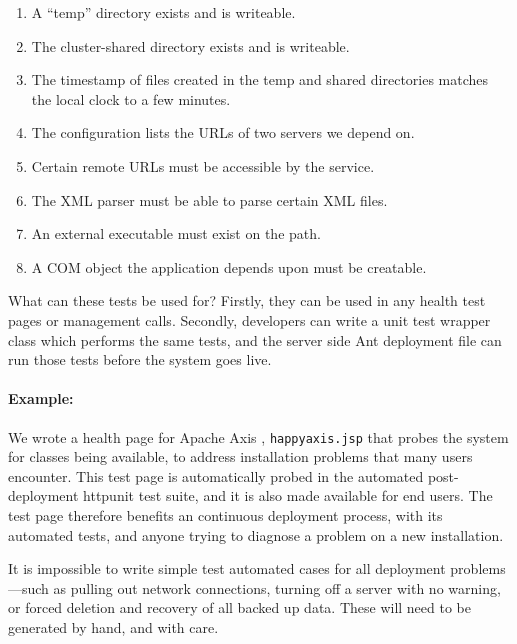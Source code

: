 \documentclass[draft]{report}
\begin{document}
\begin{enumerate}

\item A ``temp'' directory exists and is writeable.

\item The cluster-shared directory exists and is writeable.

\item The timestamp of files created in the temp and shared directories
matches the local clock to a few minutes.

\item The configuration lists the URLs of two servers we depend on.

\item Certain remote URLs must be accessible by the service.

\item The XML parser must be able to parse certain XML files.

\item An external executable must exist on the path.

\item A COM object the application depends upon must be creatable.

\end{enumerate}

What can these tests be used for? Firstly, they can be used in any
health test pages or management calls. Secondly, developers can write a
unit test wrapper class which performs the same tests, and the server
side Ant deployment file can run those tests before the system goes
live.

\paragraph{Example:} We wrote a health page for Apache Axis
\cite{apache:axis}, \verb$happyaxis.jsp$ that probes the system for
classes being available, to address installation problems that many
users encounter. This test page is automatically probed in the automated
post-deployment httpunit test suite, and it is also made available for
end users. The test page therefore benefits an continuous deployment
process, with its automated tests, and anyone trying to diagnose a
problem on a new installation.

It is impossible to write simple test automated cases for all deployment
problems ---such as pulling out network connections, turning off a
server with no warning, or forced deletion and recovery of all backed up
data. These will need to be generated by hand, and with care.
\end{document}
